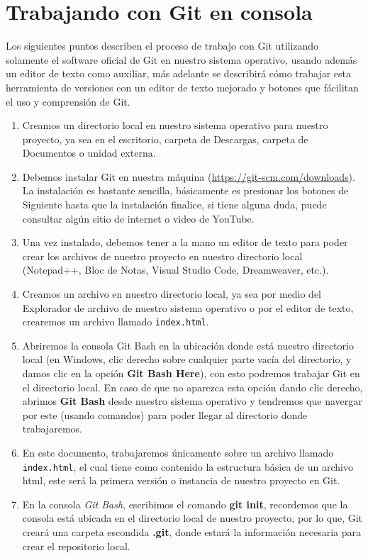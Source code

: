 \section{Trabajando con Git en consola}
\hspace{0.55cm}Los siguientes puntos describen el proceso de trabajo con Git utilizando solamente el software oficial de Git en nuestro sistema operativo, usando además un editor de texto como auxiliar, más adelante se describirá cómo trabajar esta herramienta de versiones con un editor de texto mejorado y botones que fácilitan el uso y comprensión de Git.
\begin{enumerate}
    \item Creamos un directorio local en nuestro sistema operativo para nuestro proyecto, ya sea en el escritorio, carpeta de Descargas, carpeta de Documentos o unidad externa.
    \item Debemos instalar Git en nuestra máquina (\underline{https://git-scm.com/downloads}). La instalación es bastante sencilla, básicamente es presionar los botones de Siguiente hasta que la instalación finalice, si tiene alguna duda, puede consultar algún sitio de internet o video de YouTube.
    \item Una vez instalado, debemos tener a la mano un editor de texto para poder crear los archivos de nuestro proyecto en nuestro directorio local (Notepad++, Bloc de Notas, Visual Studio Code, Dreamweaver, etc.).
    \item Creamos un archivo en nuestro directorio local, ya sea por medio del Explorador de archivo de nuestro sistema operativo o por el editor de texto, crearemos un archivo llamado \texttt{index.html}.
    \item Abriremos la consola Git Bash en la ubicación donde está nuestro directorio local (en Windows, clic derecho sobre cualquier parte vacía del directorio, y damos clic en la opción \textbf{Git Bash Here}), con esto podremos trabajar Git en el directorio local. En caso de que no aparezca esta opción dando clic derecho, abrimos \textbf{Git Bash} desde nuestro sistema operativo y tendremos que navergar por este (usando comandos) para poder llegar al directorio donde trabajaremos.
    \item En este documento, trabajaremos únicamente sobre un archivo llamado \texttt{index.html}, el cual tiene como contenido la estructura básica de un archivo html, este será la primera versión o instancia de nuestro proyecto en Git.
    \item En la consola \textit{Git Bash}, escribimos el comando \textbf{git init}, recordemos que la consola está ubicada en el directorio local de nuestro proyecto, por lo que, Git creará una carpeta escondida \textbf{.git}, donde estará la información necesaria para crear el repositorio local.

\end{enumerate}

